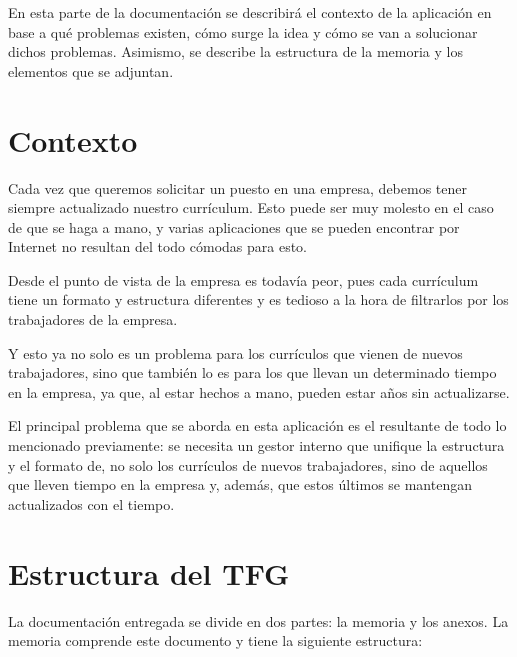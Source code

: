 
En esta parte de la documentación se describirá el contexto de la aplicación en base a qué
problemas existen, cómo surge la idea y cómo se van a solucionar dichos problemas. Asimismo, 
se describe la estructura de la memoria y los elementos que se adjuntan.

\section{Contexto}
Cada vez que queremos solicitar un puesto en una empresa, debemos tener 
siempre actualizado nuestro currículum. Esto puede ser muy molesto en el caso
de que se haga a mano, y varias aplicaciones que se pueden encontrar por Internet 
no resultan del todo cómodas para esto.

Desde el punto de vista de la empresa es todavía peor, pues cada currículum tiene un 
formato y estructura diferentes y es tedioso a la hora de filtrarlos por los trabajadores
de la empresa.

Y esto ya no solo es un problema para los currículos que vienen de nuevos trabajadores,
sino que también lo es para los que llevan un determinado tiempo en la empresa, ya que,
al estar hechos a mano, pueden estar años sin actualizarse.

El principal problema que se aborda en esta aplicación es el resultante de todo lo mencionado
previamente: se necesita un gestor interno que unifique la estructura y el formato
de, no solo los currículos de nuevos trabajadores, sino de aquellos que lleven tiempo
en la empresa y, además, que estos últimos se mantengan actualizados con el tiempo.

\section{Estructura del TFG}

La documentación entregada se divide en dos partes: la memoria y los anexos.
La memoria comprende este documento y tiene la siguiente estructura:

